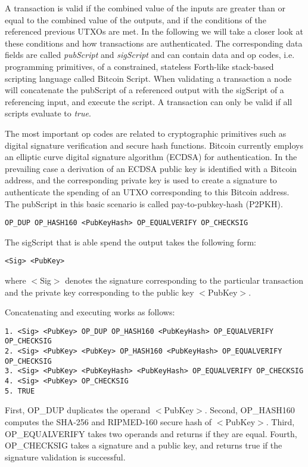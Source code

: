 A transaction is valid if the combined value of the inputs are greater than or equal to the combined value of the outputs, and if the conditions of the referenced previous UTXOs are met.
In the following we will take a closer look at these conditions and how transactions are authenticated. The corresponding data fields are called \emph{pubScript} and \emph{sigScript} and can contain data and op codes, i.e. programming primitives, of a constrained, stateless Forth-like stack-based scripting language called Bitcoin Script. 
When validating a transaction a node will concatenate the pubScript of a referenced output with the sigScript of a referencing input, and execute the script. A transaction can only be valid if all  scripts evaluate to \emph{true}. 

The most important op codes are related to cryptographic primitives such as digital signature verification and secure hash functions. Bitcoin currently employs an elliptic curve digital signature algorithm (ECDSA) for authentication. In the prevailing case a derivation of an ECDSA public key is identified with a Bitcoin address, and the corresponding private key is used to create a signature to authenticate the spending of an UTXO corresponding to this Bitcoin address. 
The pubScript in this basic scenario is called pay-to-pubkey-hash (P2PKH).

\begin{lstlisting}
OP_DUP OP_HASH160 <PubKeyHash> OP_EQUALVERIFY OP_CHECKSIG
\end{lstlisting}

The sigScript that is able spend the output takes the following form:

\begin{lstlisting}
<Sig> <PubKey>
\end{lstlisting}

where $<$Sig$>$ denotes the signature corresponding to the particular transaction and the private key corresponding to the public key $<$PubKey$>$.

Concatenating and executing works as follows:

\begin{lstlisting}[breaklines]
1. <Sig> <PubKey> OP_DUP OP_HASH160 <PubKeyHash> OP_EQUALVERIFY OP_CHECKSIG
2. <Sig> <PubKey> <PubKey> OP_HASH160 <PubKeyHash> OP_EQUALVERIFY OP_CHECKSIG
3. <Sig> <PubKey> <PubKeyHash> <PubKeyHash> OP_EQUALVERIFY OP_CHECKSIG
4. <Sig> <PubKey> OP_CHECKSIG
5. TRUE
\end{lstlisting}

First, OP\_DUP duplicates the operand $<$PubKey$>$. Second, OP\_HASH160 computes the SHA-256 and RIPMED-160 secure hash of $<$PubKey$>$. Third, OP\_EQUALVERIFY takes two operands and returns if they are equal. Fourth, OP\_CHECKSIG takes a signature and a public key, and returns true if the signature validation is successful. 

